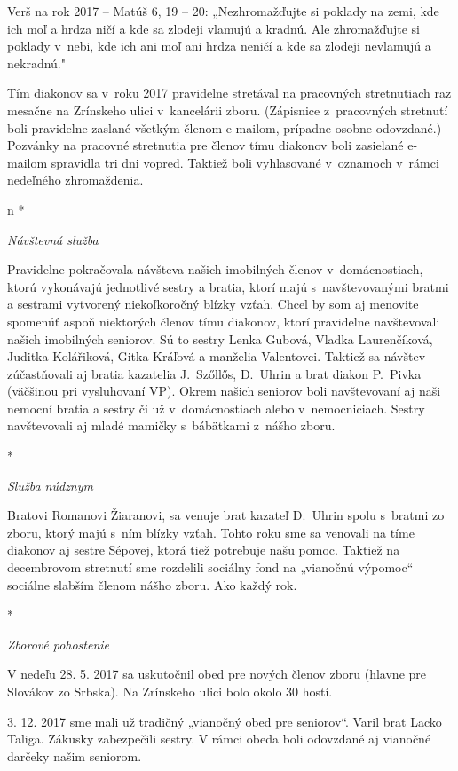 
Verš na rok 2017 -- Matúš 6, 19 -- 20: „Nezhromažďujte si poklady na zemi, kde ich moľ a hrdza ničí a kde sa zlodeji vlamujú a kradnú. Ale zhromažďujte si poklady v~nebi, kde ich ani moľ ani hrdza neničí a kde sa zlodeji nevlamujú a nekradnú."


Tím diakonov sa v~roku 2017 pravidelne stretával na pracovných stretnutiach raz mesačne na Zrínskeho ulici v~kancelárii zboru. (Zápisnice z~pracovných stretnutí boli pravidelne zaslané všetkým členom e-mailom, prípadne osobne odovzdané.) Pozvánky na pracovné stretnutia pre členov tímu diakonov boli zasielané e-mailom spravidla tri dni vopred. Taktiež boli vyhlasované v~oznamoch v~rámci  nedeľného  zhromaždenia.

\def\aktivita#1{{\it #1\par}\firstnoindent}

\begitems \style n
* \aktivita{Návštevná služba}
Pravidelne pokračovala návšteva našich imobilných členov v~domácnostiach, ktorú vykonávajú jednotlivé sestry a bratia, ktorí majú s~navštevovanými bratmi a sestrami vytvorený niekoľkoročný blízky vzťah.  Chcel by som aj menovite spomenúť aspoň niektorých  členov tímu diakonov, ktorí pravidelne navštevovali našich imobilných seniorov. Sú to sestry Lenka Gubová, Vladka Laurenčíková, Juditka Kolářiková, Gitka Kráľová a manželia Valentovci. Taktiež sa návštev zúčastňovali aj bratia kazatelia J.~Szőllős, D.~Uhrin a brat diakon P.~Pivka (väčšinou pri vysluhovaní VP).
Okrem našich seniorov boli navštevovaní aj naši nemocní bratia a sestry či už v~domácnostiach alebo v~nemocniciach. Sestry navštevovali aj mladé mamičky s~bábätkami z~nášho zboru.

* \aktivita{Služba núdznym}
Bratovi Romanovi Žiaranovi, sa venuje brat kazateľ D.~Uhrin spolu s~bratmi zo zboru, ktorý majú s~ním blízky vzťah. Tohto roku sme sa venovali na tíme diakonov aj sestre Sépovej, ktorá tiež potrebuje našu pomoc.
Taktiež na decembrovom stretnutí sme rozdelili sociálny fond na „vianočnú výpomoc“ sociálne slabším členom nášho zboru. Ako každý rok.

* \aktivita{Zborové pohostenie}
V nedeľu 28. 5. 2017 sa uskutočnil obed pre nových členov zboru (hlavne pre Slovákov zo Srbska). Na Zrínskeho ulici bolo okolo 30 hostí.

3. 12. 2017 sme mali už tradičný „vianočný obed pre seniorov“. Varil brat Lacko Taliga. Zákusky zabezpečili sestry. V rámci obeda boli odovzdané aj vianočné darčeky našim seniorom.

